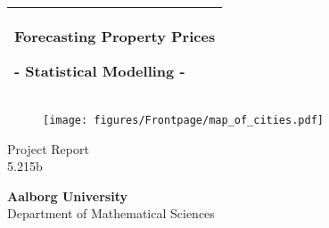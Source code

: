 %
\begin{titlepage}
  \addtolength{\hoffset}{0.5\evensidemargin-0.5\oddsidemargin} %
  \noindent%
  \begin{tabular}{@{}p{\textwidth}@{}}
    \toprule[2pt]
    \midrule
    \vspace{0.2cm}
    \begin{center}
    \Huge{\textbf{
      Forecasting Property Prices%
    }}
    \end{center}
    \begin{center}
      \Large{
        - Statistical Modelling -%
      }
    \end{center}
    \vspace{0.2cm}\\
    \midrule
    \toprule[2pt]
  \end{tabular}
  \begin{figure}[H]
      \centering
      \texttt{[image: figures/Frontpage/map\_of\_cities.pdf]}
  \end{figure}
  \vspace{0.5 mm}
  \begin{center}
    {\large
      Project Report%
    }\\
    \vspace{0.2cm}
    {\Large
      5.215b%
    }
  \end{center}
  \vfill
  \begin{center}
  {\Large \textbf{Aalborg University}}\\ \vspace{5pt}
  Department of Mathematical Sciences
  \end{center}
\end{titlepage}
\clearpage